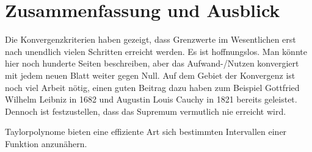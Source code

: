 
\chapter{Zusammenfassung und Ausblick}
\label{chapter-fazit}

Die Konvergenzkriterien haben gezeigt, dass Grenzwerte im Wesentlichen erst nach unendlich vielen Schritten erreicht werden.
Es ist hoffnungslos. Man könnte hier noch hunderte Seiten beschreiben, aber das Aufwand-/Nutzen konvergiert mit jedem neuen Blatt weiter gegen Null. Auf dem Gebiet der Konvergenz ist noch viel Arbeit nötig, einen guten Beitrag dazu haben zum Beispiel Gottfried Wilhelm Leibniz \cite{cauchy1682} in 1682 und  Augustin Louis Cauchy in 1821 bereits geleistet.
Dennoch ist festzustellen, dass das Supremum vermutlich nie erreicht wird.

Taylorpolynome bieten eine effiziente Art sich bestimmten Intervallen einer Funktion anzunähern. 